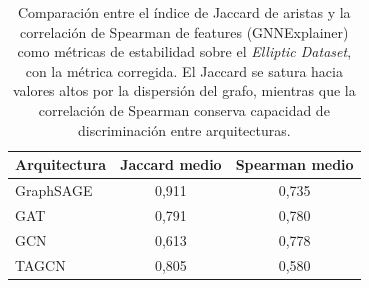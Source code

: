 \begin{table}[htbp]
\centering
\renewcommand{\arraystretch}{1.3}
\begin{tabular}{lcc}
\toprule
\textbf{Arquitectura} & \textbf{Jaccard medio} & \textbf{Spearman medio} \\
\midrule
GraphSAGE & 0,911 & 0,735 \\
GAT & 0,791 & 0,780 \\
GCN & 0,613 & 0,778 \\
TAGCN & 0,805 & 0,580 \\
\bottomrule
\end{tabular}
\caption{Comparación entre el índice de Jaccard de aristas y la correlación de Spearman de features (GNNExplainer) como métricas de estabilidad sobre el \textit{Elliptic Dataset}, con la métrica corregida. El Jaccard se satura hacia valores altos por la dispersión del grafo, mientras que la correlación de Spearman conserva capacidad de discriminación entre arquitecturas.}
\label{tab:jaccard}
\end{table}
